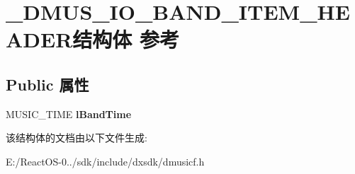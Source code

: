 \hypertarget{struct___d_m_u_s___i_o___b_a_n_d___i_t_e_m___h_e_a_d_e_r}{}\section{\+\_\+\+D\+M\+U\+S\+\_\+\+I\+O\+\_\+\+B\+A\+N\+D\+\_\+\+I\+T\+E\+M\+\_\+\+H\+E\+A\+D\+E\+R结构体 参考}
\label{struct___d_m_u_s___i_o___b_a_n_d___i_t_e_m___h_e_a_d_e_r}
\subsection*{Public 属性}
\begin{DoxyCompactItemize}
\item 
\mbox{\label{struct___d_m_u_s___i_o___b_a_n_d___i_t_e_m___h_e_a_d_e_r_a71d94eedc32eefdd82f26ca2f97c0521}} 
M\+U\+S\+I\+C\+\_\+\+T\+I\+ME {\bfseries l\+Band\+Time}
\end{DoxyCompactItemize}


该结构体的文档由以下文件生成\+:\begin{DoxyCompactItemize}
\item 
E\+:/\+React\+O\+S-\/0../sdk/include/dxsdk/dmusicf.\+h\end{DoxyCompactItemize}
